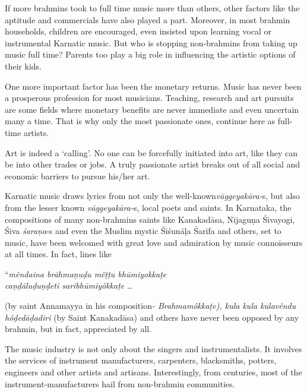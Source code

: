 If more brahmins took to full time music more than others, other factors like the aptitude and commercials have also played a part. Moreover, in most brahmin households, children are encouraged, even insisted upon learning vocal or instrumental Karnatic music. But who is stopping non-brahmins from taking up music full time? Parents too play a big role in influencing the artistic options of their kids.

One more important factor has been the monetary returns. Music has never been a prosperous profession for most musicians. Teaching, research and art pursuits are some fields where monetary benefits are never immediate and even uncertain many a time. That is why only the most passionate ones, continue here as full-time artists.

Art is indeed a ‘calling’. No one can be forcefully initiated into art, like they can be into other trades or jobs. A truly passionate artist breaks out of all social and economic barriers to pursue his/her art.

Karnatic music draws lyrics from not only the well-known\break \textit{vāggeyakāra-}s, but also from the lesser known \textit{vāggeyakāra-}s, local poets and saints. In Karnataka, the compositions of many non-brahmins saints like Kanakadāsa, Nijaguṇa Śivayogi, Śiva \textit{śaraṇa}-s and even the Muslim mystic Śiśunāḷa Śarīfa and others, set to music, have been welcomed with great love and admiration by music connoisseurs at all times. In fact, lines like

\begin{centerquote}
“\textit{mêndaina brāhmaṇuḍu mêṭṭu bhūmiyokkaṭe \\ caṇḍāluḍuṇḍeti saribhūmiyôkkaṭe} … 
\end{centerquote}

\newpage

(by saint Annamayya in his composition\textit{- Brahmamôkkaṭe), kula kula kulavêndu hôḍedāḍadiri} (by Saint Kanakadāsa) and others have never been opposed by any brahmin, but in fact, appreciated by all.

The music industry is not only about the singers and instrumentalists. It involves the services of instrument manufacturers, carpenters, blacksmiths, potters, engineers and other artists and artisans. Interestingly, from centuries, most of the instrument-manufacturers hail from non-brahmin communities.

